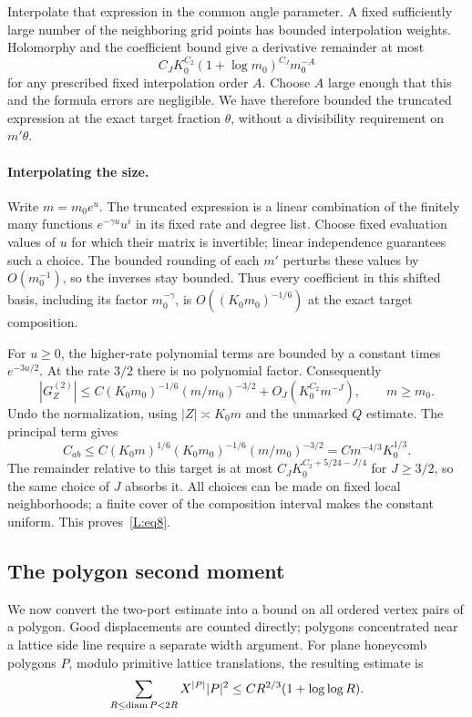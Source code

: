 Interpolate that expression in the common angle parameter. A fixed
sufficiently large number of the neighboring grid points has bounded
interpolation weights. Holomorphy and the coefficient bound give a
derivative remainder at most
\[
 C_JK_0^{C_2}(1+\log m_0)^{C_J}m_0^{-A}
\]
for any prescribed fixed interpolation order $A$. Choose $A$ large
enough that this and the formula errors are negligible. We have therefore
bounded the truncated expression at the exact target fraction $\theta$,
without a divisibility requirement on $m'\theta$.

\paragraph{Interpolating the size.}
Write $m=m_0e^u$. The truncated expression is a linear combination of
the finitely many functions $e^{-\gamma u}u^i$ in its fixed rate and
degree list. Choose fixed evaluation values of $u$ for which their
matrix is invertible; linear independence guarantees such a choice.
The bounded rounding of each $m'$ perturbs these values by $O(m_0^{-1})$,
so the inverses stay bounded. Thus every coefficient in this shifted
basis, including its factor $m_0^{-\gamma}$, is
$O((K_0m_0)^{-1/6})$ at the exact target composition.

For $u\ge0$, the higher-rate polynomial terms are bounded by a constant
times $e^{-3u/2}$. At the rate $3/2$ there is no polynomial factor.
Consequently
\[
 |G_Z^{(2)}|\le C(K_0m_0)^{-1/6}(m/m_0)^{-3/2}
                       +O_J(K_0^{C_2}m^{-J}),\qquad m\ge m_0.
\]
Undo the normalization, using $|Z|\asymp K_0m$ and the unmarked
$Q$ estimate. The principal term gives
\[
 C_{ab}\le C(K_0m)^{1/6}(K_0m_0)^{-1/6}(m/m_0)^{-3/2}
       =C m^{-4/3}K_0^{1/3}.
\]
The remainder relative to this target is at most
$C_JK_0^{C_2+5/24-J/4}$ for $J\ge3/2$, so the same choice of $J$
absorbs it. All choices can be made on fixed local neighborhoods;
a finite cover of the composition interval makes the constant uniform.
This proves~\eqref{L:eq8}.

\subsection{The polygon second moment}

We now convert the two-port estimate into a bound on all ordered vertex
pairs of a polygon. Good displacements are counted directly; polygons
concentrated near a lattice side line require a separate width argument.
For plane honeycomb polygons \(P\), modulo primitive lattice translations,
the resulting estimate is
\begin{equation}
 \sum_{R\le{\rm diam}\,P<2R} X^{|P|}|P|^2\le C R^{2/3}(1+\log\log R).\label{L:eq10}
\end{equation}
